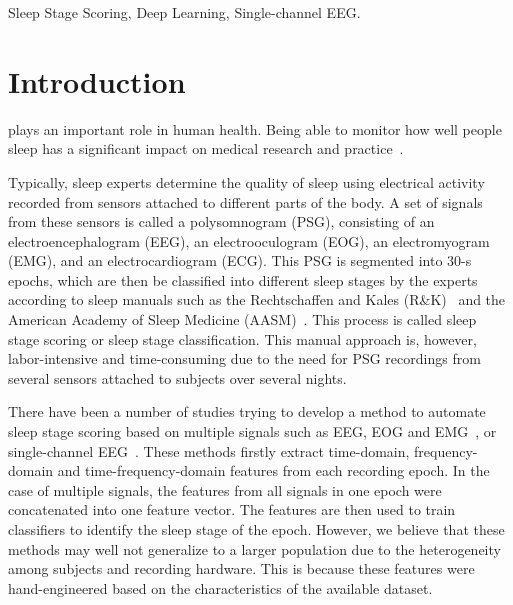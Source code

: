 \documentclass[journal,twoside]{IEEEtran}
\begin{document}
\begin{IEEEkeywords}
Sleep Stage Scoring, Deep Learning, Single-channel EEG.
\end{IEEEkeywords}


\IEEEpeerreviewmaketitle



\section{Introduction}


 plays an important role in human health. Being able to monitor how well people sleep has a significant impact on medical research and practice~\cite{Wulff2010}. 

Typically, sleep experts determine the quality of sleep using electrical activity recorded from sensors attached to different parts of the body. A set of signals from these sensors is called a polysomnogram (PSG), consisting of an electroencephalogram (EEG), an electrooculogram (EOG), an electromyogram (EMG), and an electrocardiogram (ECG). This PSG is segmented into \mbox{30-s} epochs, which are then be classified into different sleep stages by the experts according to sleep manuals such as the Rechtschaffen and Kales (R\&K)~\cite{AllanHobson1969} and the American Academy of Sleep Medicine (AASM)~\cite{iber2007}. This process is called sleep stage scoring or sleep stage classification. This manual approach is, however, labor-intensive and time-consuming due to the need for PSG recordings from several sensors attached to subjects over several nights.

There have been a number of studies trying to develop a method to automate sleep stage scoring based on multiple signals such as EEG, EOG and EMG~\cite{lajnef2015,huang2014,gunes2010}, or single-channel EEG~\cite{tsinalis2016,sharma2017,hassan2017}. These methods firstly extract time-domain, frequency-domain and time-frequency-domain features from each recording epoch. 
In the case of multiple signals, the features from all signals in one epoch were concatenated into one feature vector.
The features are then used to train classifiers to identify the sleep stage of the epoch. However, we believe that these methods may well not generalize to a larger population due to the heterogeneity among subjects and recording hardware. This is because these features were hand-engineered based on the characteristics of the available dataset.
\end{document}
